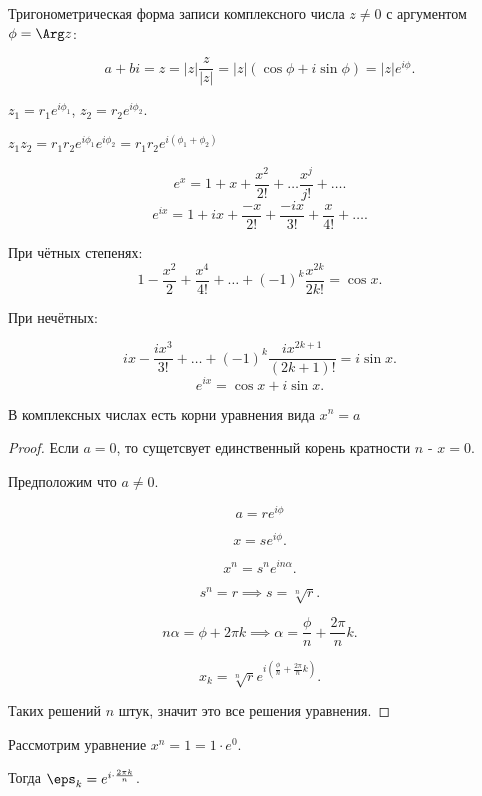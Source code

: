 \begin{definition} 
    Тригонометрическая форма записи комплексного числа $z \neq 0$ с аргументом $\phi = \Arg z$:

    \[ a+bi = z = |z| \frac{z}{|z|} = |z| \left( \cos \phi + i\sin \phi \right) = |z|e^{i\phi}.\] 
\end{definition}
\begin{properties} 
    $z_1 = r_1e^{i\phi_1}$, $z_2 = r_2e^{i\phi_2}$.

    $z_1z_2 = r_1r_2 e^{i\phi_1} e^{i\phi_2} = r_1r_2 e^{i(\phi_1 + \phi_2)}$
\end{properties}
\begin{remark} 
    \[ e^{x} = 1 + x + \frac{x^2}{2!} + \ldots \frac{x^{j}}{j!} + \ldots .\]
    \[ e^{ix} = 1 + ix + \frac{-x}{2!} + \frac{-ix}{3!} + \frac{x}{4!} + \ldots .\]

    При чётных степенях:
    \[ 1 - \frac{x^2}{2} + \frac{x^{4}}{4!} + \ldots + (-1)^{k} \frac{x^{2k}}{2k!} = \cos x.\]
    
    При нечётных:
    
    \[ ix - \frac{ix^3}{3!} + \ldots + (-1)^{k}\frac{ix^{2k+1}}{(2k+1)!} = i\sin x.\]
    \[ e^{ix} = \cos x + i\sin x .\] 
\end{remark}
\begin{theorem} 
    В комплексных числах есть корни уравнения вида $x^{n} = a$
    \begin{proof}
        Если $a=0$, то сущетсвует единственный корень кратности $n$ - $x=0$.
        
        Предположим что $a\neq 0$.
    
        \[ a = re^{i\phi} \] 

        \[ x = s e^{i\phi} .\]
        
        \[ x^{n} = s^{n} e^{in\alpha} .\]

        \[ s^{n} = r \implies s = \sqrt[n]{r}  .\]

        \[ n\alpha = \phi + 2\pi k \implies \alpha = \frac{\phi}{n} + \frac{2\pi}{n}k.\]
        
        \[ x_k = \sqrt[n]{r} e^{i\left( \frac{\phi}{n} + \frac{2\pi}{n}k \right) }  .\]

        Таких решений $n$ штук, значит это все решения уравнения.
    \end{proof}
\end{theorem}
\begin{example} 
    Рассмотрим уравнение $x^{n} = 1 = 1 \cdot e^{0}$.

    Тогда $\eps_k = e^{i \cdot \frac{2\pi k}{n}}$. 
\end{example}
